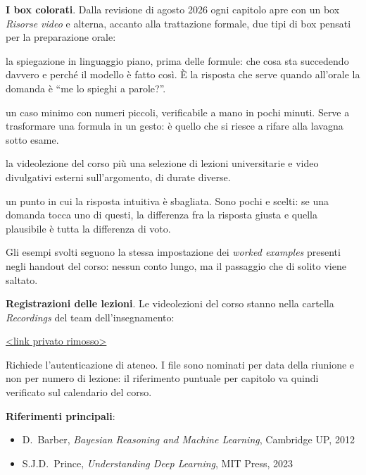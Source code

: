 \documentclass[11pt,a4paper,openany]{book}
\theoremstyle{definition}
\begin{document}
\medskip
\textbf{I box colorati}. Dalla revisione di agosto 2026 ogni capitolo apre con un box \emph{Risorse video} e alterna, accanto alla trattazione formale, due tipi di box pensati per la preparazione orale:

\begin{description}[leftmargin=2.2em]
  \item[\textcolor{Violet!65!black}{Intuizione}] la spiegazione in linguaggio piano, prima delle formule: che cosa sta succedendo davvero e perché il modello è fatto così. È la risposta che serve quando all'orale la domanda è ``me lo spieghi a parole?''.
  \item[\textcolor{BurntOrange!85!black}{Esempio svolto}] un caso minimo con numeri piccoli, verificabile a mano in pochi minuti. Serve a trasformare una formula in un gesto: è quello che si riesce a rifare alla lavagna sotto esame.
  \item[\textcolor{TealBlue!65!black}{Risorse video}] la videolezione del corso più una selezione di lezioni universitarie e video divulgativi esterni sull'argomento, di durate diverse.
  \item[\textcolor{Red!70!black}{Trappola}] un punto in cui la risposta intuitiva è sbagliata. Sono pochi e scelti: se una domanda tocca uno di questi, la differenza fra la risposta giusta e quella plausibile è tutta la differenza di voto.
\end{description}

Gli esempi svolti seguono la stessa impostazione dei \emph{worked examples} presenti negli handout del corso: nessun conto lungo, ma il passaggio che di solito viene saltato.

\medskip
\textbf{Registrazioni delle lezioni}. Le videolezioni del corso stanno nella cartella \emph{Recordings} del team dell'insegnamento:

\begin{center}\small
\url{<link privato rimosso>}
\end{center}

\noindent Richiede l'autenticazione di ateneo. I file sono nominati per data della riunione e non per numero di lezione: il riferimento puntuale per capitolo va quindi verificato sul calendario del corso.

\medskip
\textbf{Riferimenti principali}:
\begin{itemize}
  \item D.\ Barber, \textit{Bayesian Reasoning and Machine Learning}, Cambridge UP, 2012
  \item S.J.D.\ Prince, \textit{Understanding Deep Learning}, MIT Press, 2023
\end{itemize}
\end{document}
